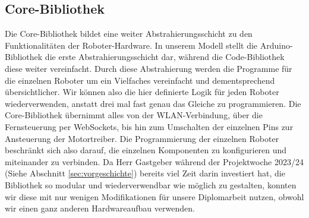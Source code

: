 \subsection{Core-Bibliothek}
\label{subec:robots_core}
Die Core-Bibliothek bildet eine weiter Abstrahierungsschicht zu den Funktionalitäten der Roboter-Hardware.
%
In unserem Modell stellt die Arduino-Bibliothek die erste Abstrahierungsschicht dar,
während die Code-Bibliothek diese weiter vereinfacht.
%
Durch diese Abstrahierung werden die Programme für die einzelnen Roboter um ein Vielfaches vereinfacht und dementsprechend übersichtlicher.
%
Wir können also die hier definierte Logik für jeden Roboter wiederverwenden,
anstatt drei mal fast genau das Gleiche zu programmieren.
%
Die Core-Bibliothek übernimmt alles von der WLAN-Verbindung,
über die Fernsteuerung per WebSockets,
bis hin zum Umschalten der einzelnen Pins zur Ansteuerung der Motortreiber.
%
Die Programmierung der einzelnen Roboter beschränkt sich also darauf,
die einzelnen Komponenten zu konfigurieren und miteinander zu verbinden.
%
Da Herr Gastgeber während der Projektwoche 2023/24 (Siehe Abschnitt \ref{sec:vorgeschichte}) bereits viel Zeit darin investiert hat,
die Bibliothek so modular und wiederverwendbar wie möglich zu gestalten,
konnten wir diese mit nur wenigen Modifikationen für unsere Diplomarbeit nutzen,
obwohl wir einen ganz anderen Hardwareaufbau verwenden.


